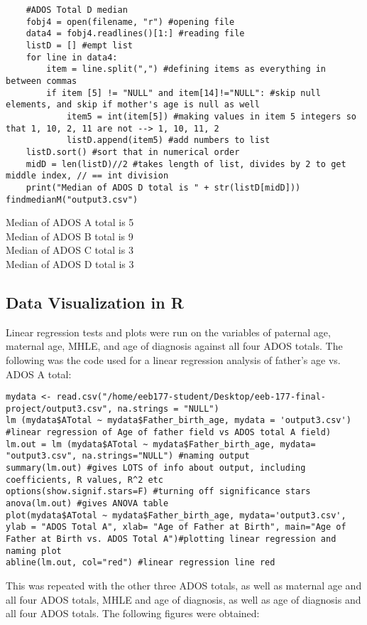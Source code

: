 \documentclass{article}
\begin{document}
\begin{verbatim}
    #ADOS Total D median
    fobj4 = open(filename, "r") #opening file
    data4 = fobj4.readlines()[1:] #reading file
    listD = [] #empt list
    for line in data4:
        item = line.split(",") #defining items as everything in between commas
        if item [5] != "NULL" and item[14]!="NULL": #skip null elements, and skip if mother's age is null as well
            item5 = int(item[5]) #making values in item 5 integers so that 1, 10, 2, 11 are not --> 1, 10, 11, 2
            listD.append(item5) #add numbers to list
    listD.sort() #sort that in numerical order
    midD = len(listD)//2 #takes length of list, divides by 2 to get middle index, // == int division
    print("Median of ADOS D total is " + str(listD[midD]))
findmedianM("output3.csv")
\end{verbatim}
Median of ADOS A total is 5\\
Median of ADOS B total is 9\\
Median of ADOS C total is 3\\
Median of ADOS D total is 3\\

\subsection{Data Visualization in R}
Linear regression tests and plots were run on the variables of paternal age, maternal age, MHLE, and age of diagnosis against all four ADOS totals. The following was the code used for a linear regression analysis of father's age vs. ADOS A total: 
\begin{verbatim}
mydata <- read.csv("/home/eeb177-student/Desktop/eeb-177-final-project/output3.csv", na.strings = "NULL")
lm (mydata$ATotal ~ mydata$Father_birth_age, mydata = 'output3.csv') #linear regression of Age of father field vs ADOS total A field)
lm.out = lm (mydata$ATotal ~ mydata$Father_birth_age, mydata= "output3.csv", na.strings="NULL") #naming output
summary(lm.out) #gives LOTS of info about output, including coefficients, R values, R^2 etc
options(show.signif.stars=F) #turning off significance stars
anova(lm.out) #gives ANOVA table
plot(mydata$ATotal ~ mydata$Father_birth_age, mydata='output3.csv', ylab = "ADOS Total A", xlab= "Age of Father at Birth", main="Age of Father at Birth vs. ADOS Total A")#plotting linear regression and naming plot
abline(lm.out, col="red") #linear regression line red
\end{verbatim}

This was repeated with the other three ADOS totals, as well as maternal age and all four ADOS totals, MHLE and age of diagnosis, as well as age of diagnosis and all four ADOS totals. The following figures were obtained:
\end{document}
